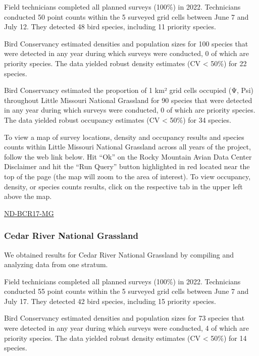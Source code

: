 \documentclass[
  letterpaper,
  DIV=11,
  numbers=noendperiod,
  oneside]{scrreprt}
\begin{document}
Field technicians completed all planned surveys (100\%) in 2022.
Technicians conducted 50 point counts within the 5 surveyed grid cells
between June 7 and July 12. They detected 48 bird species, including 11
priority species.

Bird Conservancy estimated densities and population sizes for 100
species that were detected in any year during which surveys were
conducted, 0 of which are priority species. The data yielded robust
density estimates (CV \textless{} 50\%) for 22 species.

Bird Conservancy estimated the proportion of 1 km² grid cells occupied
(Ψ, Psi) throughout Little Missouri National Grassland for 90 species
that were detected in any year during which surveys were conducted, 0 of
which are priority species. The data yielded robust occupancy estimates
(CV \textless{} 50\%) for 34 species.

To view a map of survey locations, density and occupancy results and
species counts within Little Missouri National Grassland across all
years of the project, follow the web link below. Hit ``Ok'' on the Rocky
Mountain Avian Data Center Disclaimer and hit the ``Run Query'' button
highlighted in red located near the top of the page (the map will zoom
to the area of interest). To view occupancy, density, or species counts
results, click on the respective tab in the upper left above the map.

\href{http://www.rmbo.org/new_site/adc/QueryWindow.aspx\#N4IgzgLgTghhCuBbEAuABCAcgEQLQCEBhAJQEYB2XAWQHF0AZASwggBsBTNKxsMAe3hRGaTHEZ8AdjFZoasXqxgSAJiAC+QA}{ND-BCR17-MG}

\hypertarget{cedar-river-national-grassland}{%
\subsubsection{Cedar River National
Grassland}\label{cedar-river-national-grassland}}

We obtained results for Cedar River National Grassland by compiling and
analyzing data from one stratum.

Field technicians completed all planned surveys (100\%) in 2022.
Technicians conducted 55 point counts within the 5 surveyed grid cells
between June 7 and July 17. They detected 42 bird species, including 15
priority species.

Bird Conservancy estimated densities and population sizes for 73 species
that were detected in any year during which surveys were conducted, 4 of
which are priority species. The data yielded robust density estimates
(CV \textless{} 50\%) for 14 species.
\end{document}
